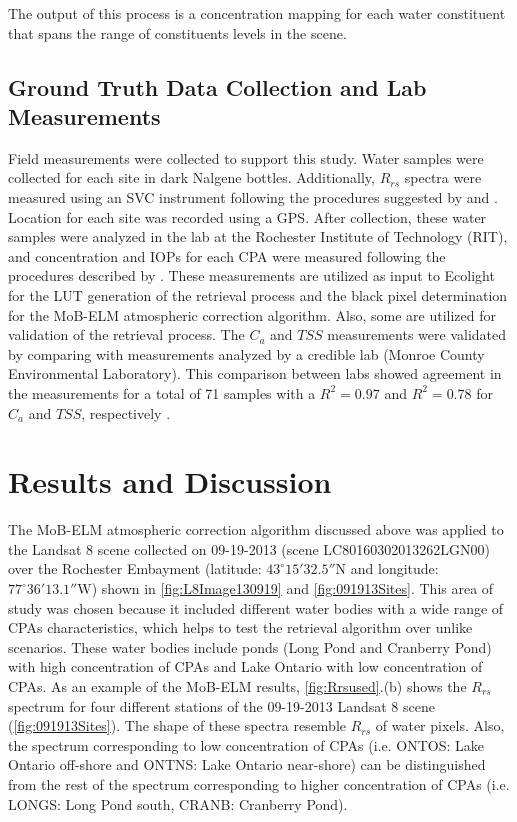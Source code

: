 \documentclass[onecolumn,3p,letterpaper]{elsarticle}
\begin{document}
The output of this process is a concentration mapping for each water constituent that spans the range of constituents levels in the scene. 

\subsection{Ground Truth Data Collection and Lab Measurements}
\label{subsec:FieldLabMea}

Field measurements were collected to support this study. Water samples were collected for each site in dark Nalgene bottles. Additionally, $R_{rs}$ spectra were measured using an SVC instrument \citep{SVCHR1024i} following the procedures suggested by \citet{Mobley:1999} and \citet{Mueller1995}. Location for each site was recorded using a GPS. After collection, these water samples were analyzed in the lab at the Rochester Institute of Technology (RIT), and concentration and IOPs for each CPA were measured following the procedures described by \citet{Mitchell2002}. These measurements are utilized as input to Ecolight for the LUT generation of the retrieval process and the black pixel determination for the MoB-ELM atmospheric correction algorithm. Also, some are utilized for validation of the retrieval process. The $C_a$ and $TSS$ measurements were validated by comparing with measurements analyzed by a credible lab (Monroe County Environmental Laboratory). This comparison between labs showed agreement in the measurements for a total of 71 samples with a $R^2=0.97$ and $R^2=0.78$ for $C_a$ and $TSS$, respectively \citep{ConchaThesis2015}.

\section{Results and Discussion}
\label{sec:Results}

The MoB-ELM atmospheric correction algorithm discussed above was applied to the Landsat 8 scene collected on 09-19-2013 (scene LC80160302013262LGN00) over the Rochester Embayment (latitude: $43^\circ15'32.5''$N and longitude: $77^\circ36'13.1''$W) shown in \autoref{fig:L8Image130919} and \autoref{fig:091913Sites}. This area of study was chosen because it included different water bodies with a wide range of CPAs characteristics, which helps to test the retrieval algorithm over unlike scenarios. These water bodies include ponds (Long Pond and Cranberry Pond) with high concentration of CPAs and Lake Ontario with low concentration of CPAs. As an example of the MoB-ELM results, \autoref{fig:Rrsused}.(b) shows the $R_{rs}$ spectrum for four different stations of the 09-19-2013 Landsat 8 scene (\autoref{fig:091913Sites}). The shape of these spectra resemble $R_{rs}$ of water pixels. Also, the spectrum corresponding to low concentration of CPAs (i.e. ONTOS: Lake Ontario off-shore and ONTNS: Lake Ontario near-shore) can be distinguished from the rest of the spectrum corresponding to higher concentration of CPAs (i.e. LONGS: Long Pond south, CRANB: Cranberry Pond).
\end{document}

